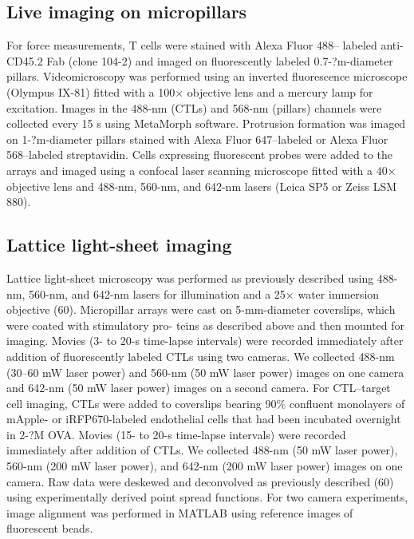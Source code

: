 \subsection{Live imaging on micropillars}
For force measurements, T cells were stained with Alexa Fluor 488– labeled anti-CD45.2 Fab (clone 104-2) and imaged on fluorescently labeled 0.7-?m-diameter pillars. Videomicroscopy was performed using an inverted fluorescence microscope (Olympus IX-81) fitted with a 100× objective lens and a mercury lamp for excitation. Images in the 488-nm (CTLs) and 568-nm (pillars) channels were collected every 15 s using MetaMorph software. Protrusion formation was imaged on 1-?m-diameter pillars stained with Alexa Fluor 647–labeled or Alexa Fluor 568–labeled streptavidin. Cells expressing fluorescent probes were added to the arrays and imaged using a confocal laser scanning microscope fitted with a 40× objective lens and 488-nm, 560-nm, and 642-nm lasers (Leica SP5 or Zeiss LSM 880).

\subsection{Lattice light-sheet imaging}
Lattice light-sheet microscopy was performed as previously described using 488-nm, 560-nm, and 642-nm lasers for illumination and a 25× water immersion objective (60). Micropillar arrays were cast on 5-mm-diameter coverslips, which were coated with stimulatory pro- teins as described above and then mounted for imaging. Movies (3- to 20-s time-lapse intervals) were recorded immediately after addition of fluorescently labeled CTLs using two cameras. We collected 488-nm (30–60 mW laser power) and 560-nm (50 mW laser power) images on one camera and 642-nm (50 mW laser power) images on a second camera. For CTL–target cell imaging, CTLs were added to coverslips bearing 90\% confluent monolayers of mApple- or iRFP670-labeled endothelial cells that had been incubated overnight in 2-?M OVA. Movies (15- to 20-s time-lapse intervals) were recorded immediately after addition of CTLs. We collected 488-nm (50 mW laser power), 560-nm (200 mW laser power), and 642-nm (200 mW laser power) images on one camera. Raw data were deskewed and deconvolved as previously described (60) using experimentally derived point spread functions. For two camera experiments, image alignment was performed in MATLAB using reference images of fluorescent beads.

